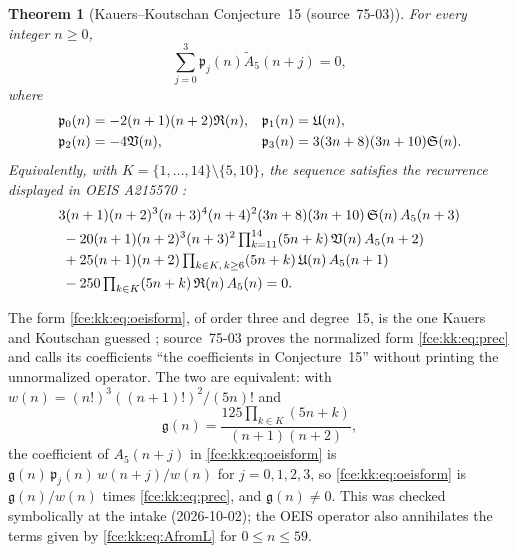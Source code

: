 \documentclass[11pt,a4paper]{article}
\numberwithin{equation}{section}
\newtheorem{theorem}{Theorem}[section]
\theoremstyle{definition}\newtheorem{definition}[theorem]{Definition}
\theoremstyle{remark}\newtheorem{remark}[theorem]{Remark}
\begin{document}
\begin{theorem}[Kauers--Koutschan Conjecture~15 (source~75-03)]\label{fce:kk:thm:recurrence}
For every integer $n\ge0$,
\begin{equation}\label{fce:kk:eq:prec}
 \sum_{j=0}^3\mathfrak p_j(n)\widetilde A_5(n+j)=0,
\end{equation}
where
\begin{align}
 \mathfrak p_0(n)&=-2(n+1)(n+2)\mathfrak R(n),&
 \mathfrak p_1(n)&=\mathfrak U(n),\notag\\
 \mathfrak p_2(n)&=-4\mathfrak V(n),&
 \mathfrak p_3(n)&=3(3n+8)(3n+10)\mathfrak S(n).\label{fce:kk:eq:ps}
\end{align}
Equivalently, with $K=\{1,\ldots,14\}\setminus\{5,10\}$, the sequence
satisfies the recurrence displayed in OEIS A215570 \cite{oeis5}:
\begin{align}
 &3(n+1)(n+2)^3(n+3)^4(n+4)^2(3n+8)(3n+10)\,\mathfrak S(n)\,A_5(n+3)\notag\\
 &\;-20(n+1)(n+2)^3(n+3)^2\textstyle\prod_{k=11}^{14}(5n+k)\,\mathfrak V(n)\,A_5(n+2)\notag\\
 &\;+25(n+1)(n+2)\textstyle\prod_{k\in K,\,k\ge6}(5n+k)\,\mathfrak U(n)\,A_5(n+1)\notag\\
 &\;-250\textstyle\prod_{k\in K}(5n+k)\,\mathfrak R(n)\,A_5(n)=0.\label{fce:kk:eq:oeisform}
\end{align}
\end{theorem}
The form \eqref{fce:kk:eq:oeisform}, of order three and degree~15, is the
one Kauers and Koutschan guessed \cite{kk}; source~75-03 proves the
normalized form \eqref{fce:kk:eq:prec} and calls its coefficients ``the
coefficients in Conjecture~15'' without printing the unnormalized operator.
The two are equivalent: with
$w(n)=(n!)^3((n+1)!)^2/(5n)!$ and
\[
 \mathfrak g(n)=\frac{125\prod_{k\in K}(5n+k)}{(n+1)(n+2)},
\]
the coefficient of $A_5(n+j)$ in \eqref{fce:kk:eq:oeisform} is
$\mathfrak g(n)\,\mathfrak p_j(n)\,w(n+j)/w(n)$ for $j=0,1,2,3$, so
\eqref{fce:kk:eq:oeisform} is $\mathfrak g(n)/w(n)$ times
\eqref{fce:kk:eq:prec}, and $\mathfrak g(n)\ne0$. This was checked
symbolically at the intake (2026-10-02); the OEIS operator also annihilates
the terms given by \eqref{fce:kk:eq:AfromL} for $0\le n\le59$.
\end{document}
